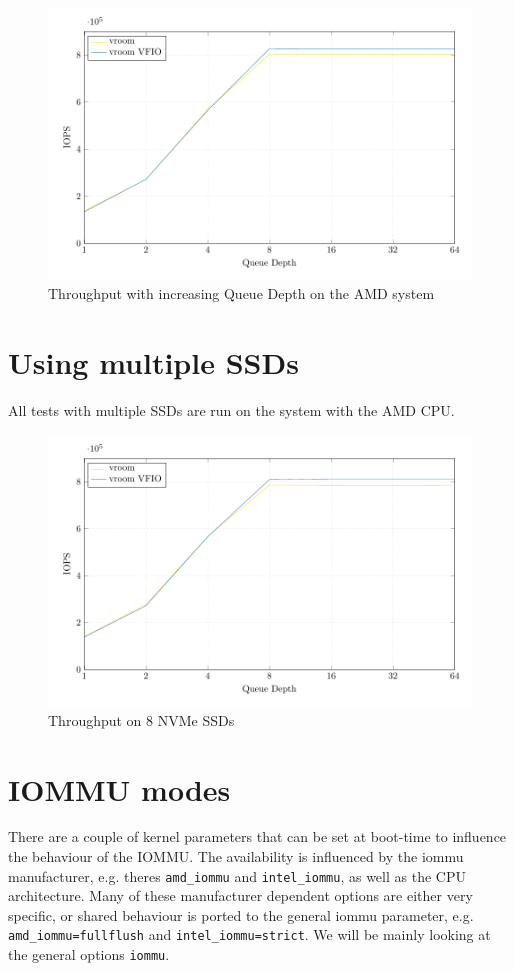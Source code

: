\begin{figure}
  \centering
  \includegraphics[width=.8\textwidth]{figures/qdnt1_2MiB_epyc}
  \caption{Throughput with increasing Queue Depth on the AMD system}
  \label{fig:qdnt1epyc}
\end{figure}

\section{Using multiple SSDs}
All tests with multiple SSDs are run on the system with the AMD CPU.

\begin{figure}
  \centering
  \includegraphics[width=\textwidth]{figures/qdnt1_2MiB_8nvmes}
  \caption{Throughput on 8 NVMe SSDs}
  \label{fig:8nvmes}
\end{figure}

\section{IOMMU modes}
There are a couple of kernel parameters that can be set at boot-time to influence the behaviour of the IOMMU. The availability is influenced by the iommu manufacturer, e.g. theres \texttt{amd\_iommu} and \texttt{intel\_iommu}, as well as the CPU architecture. Many of these manufacturer dependent options are either very specific, or shared behaviour is ported to the general iommu parameter, e.g. \texttt{amd\_iommu=fullflush} and \texttt{intel\_iommu=strict}. We will be mainly looking at the general options \texttt{iommu}.

